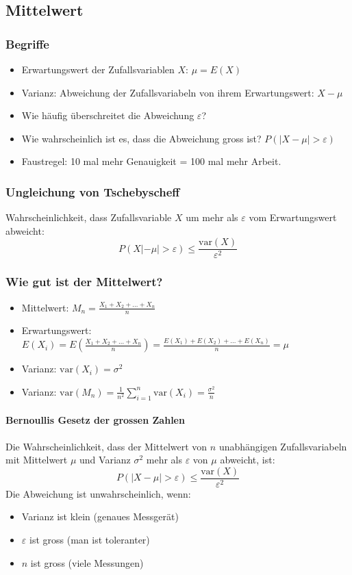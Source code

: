 \subsection{Mittelwert}
\subsubsection{Begriffe}
\begin{itemize}
  \item Erwartungswert der Zufallsvariablen $X$: $\mu = E(X)$
  \item Varianz: Abweichung der Zufallsvariabeln von ihrem
    Erwartungswert: $X -\mu$
  \item Wie häufig überschreitet die Abweichung $\varepsilon$?
  \item Wie wahrscheinlich ist es, dass die Abweichung gross ist?
    $P(|X - \mu| > \varepsilon)$
  \item Faustregel: 10 mal mehr Genauigkeit = 100 mal mehr Arbeit.
\end{itemize}
\subsubsection{Ungleichung von Tschebyscheff}
Wahrscheinlichkeit, dass Zufallsvariable $X$ um mehr als $\varepsilon$
vom Erwartungswert abweicht:
\[P(X|-\mu| > \varepsilon) \le \frac{\text{var}(X)}{\varepsilon^2} \]
\subsubsection{Wie gut ist der Mittelwert?}
\begin{itemize}
  \item Mittelwert: $M_n = \frac{X_1 + X_2 + \ldots + X_n}{n}$
  \item Erwartungswert: $E(X_i) = E\left( \frac{X_1 + X_2 + \ldots +
  X_n}{n}\right) =  \frac{E(X_1) + E(X_2) + \ldots + E(X_n)}{n} = \mu$
  \item Varianz: $\text{var}(X_i) = \sigma^2$
  \item Varianz: $\text{var}(M_n) = \frac{1}{n^2} \sum_{i=1}^n
  \text{var}(X_i) = \frac{\sigma^2}{n}$
\end{itemize}
\paragraph{Bernoullis Gesetz der grossen Zahlen}
Die Wahrscheinlichkeit, dass der Mittelwert von $n$ unabhängigen
Zufallsvariabeln mit Mittelwert $\mu$ und Varianz $\sigma^2$ mehr als
$\varepsilon$ von $\mu$ abweicht, ist:
\[P(|X-\mu| > \varepsilon) \le \frac{\text{var}(X)}{\varepsilon^2} \]
Die Abweichung ist unwahrscheinlich, wenn:
\begin{itemize}
  \item Varianz ist klein (genaues Messgerät)
  \item $\varepsilon$ ist gross (man ist toleranter)
  \item $n$ ist gross (viele Messungen)
\end{itemize}

